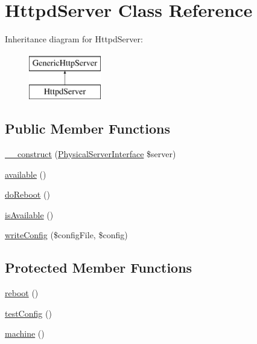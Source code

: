 \hypertarget{classHttpdServer}{\section{Httpd\-Server Class Reference}
\label{classHttpdServer}
}
Inheritance diagram for Httpd\-Server\-:\begin{figure}[H]
\begin{center}
\leavevmode
\includegraphics[height=2.000000cm]{classHttpdServer}
\end{center}
\end{figure}
\subsection*{Public Member Functions}
\begin{DoxyCompactItemize}
\item 
\hyperlink{classHttpdServer_a63ba0b7bd1d2e62cbb200bd76fc6aff1}{\-\_\-\-\_\-construct} (\hyperlink{interfacePhysicalServerInterface}{Physical\-Server\-Interface} \$server)
\item 
\hyperlink{classHttpdServer_aa49c31ec064b7246e7d72635eaef7cd4}{available} ()
\item 
\hyperlink{classGenericHttpServer_aadaefaa2c7866c61b6e5c47f5ba9cb52}{do\-Reboot} ()
\item 
\hyperlink{classGenericHttpServer_a09f17032d29735f1e4ebcf0b8a8e110f}{is\-Available} ()
\item 
\hyperlink{classGenericHttpServer_a31f8dd33820bd62522382f5b6b0117c5}{write\-Config} (\$config\-File, \$config)
\end{DoxyCompactItemize}
\subsection*{Protected Member Functions}
\begin{DoxyCompactItemize}
\item 
\hyperlink{classHttpdServer_a71e2098ca66823d5a1edae4fb71f6100}{reboot} ()
\item 
\hyperlink{classHttpdServer_a82e523f735daac0ad3fa7836f40e6302}{test\-Config} ()
\item 
\hyperlink{classGenericHttpServer_a5a3529075164ac5fd6ed20753fb14629}{machine} ()
\end{DoxyCompactItemize}


